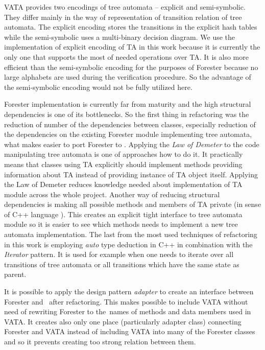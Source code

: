 \documentclass[fleqn,11pt]{ExcelAtFIT} %
\begin{document}
VATA provides two encodings of tree automata -- explicit and semi-symbolic.
They differ mainly in the way of representation of transition relation of tree automata.
The explicit encoding stores the transitions in the explicit hash tables while the semi-symbolic
uses a multi-binary decision diagram.
We use the implementation of explicit encoding of TA in this work because
it is currently the only one that supports the most of needed operations over TA.
It is also more efficient than the semi-symbolic encoding for the purposes of Forester because no large alphabets are used during the verification procedure.
So the advantage of the semi-symbolic encoding would not be fully utilized here.

Forester implementation is currently far from maturity and
the high structural dependencies is one of its bottlenecks.
So the first thing in refactoring was the reduction of number of the dependencies between classes,
especially reduction of the dependencies on the existing Forester module implementing tree automata,
what makes easier to port Forester to \vata.
Applying the \emph{Law of Demeter} \cite{lod89} to the code manipulating tree automata is one of approaches how to do it. 
It practically means that classes using TA explicitly should implement methods providing information about TA instead of providing instance of TA object itself.
Applying the Law of Demeter reduces knowledge needed about implementation of TA module across the whole project.
Another way of reducing structural dependencies is making all possible methods and members of TA private (in sense of C++ language \cite{stroustrup13}).
This creates an explicit tight interface to tree automata module so it is easier to see which methods needs to implement
a new tree automata implementation.
The last from the most used techniques of refactoring in this work is employing \emph{auto} type deduction in C++ in combination
with the \emph{Iterator} pattern.
It is used for example when one needs to iterate over all transitions of tree automata or all transitions which
have the same state as parent.

It is possible to apply the design pattern \emph{adapter} \cite{gamma95} to create
an interface between Forester and \vata\ after refactoring.
This makes possible to include VATA without need of rewriting
Forester to the~names of methods and data members used in VATA.
It creates also only one place (particularly adapter class) connecting Forester and VATA instead of
including VATA into many of the Forester classes and so it prevents creating too strong relation between them.
\end{document}
